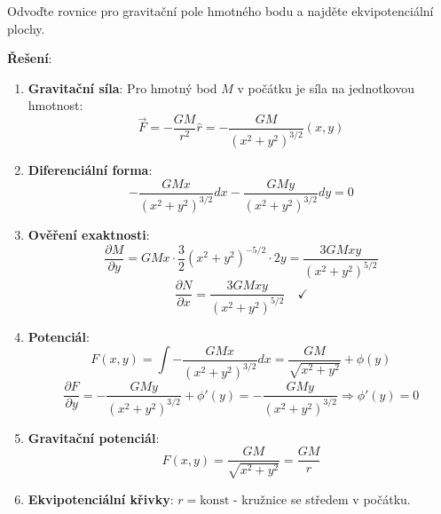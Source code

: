 \begin{example}
Odvoďte rovnice pro gravitační pole hmotného bodu a najděte ekvipotenciální plochy.
\vspace{0.3\baselineskip}

\textbf{Řešení}:
\begin{enumerate}
\item \textbf{Gravitační síla}: Pro hmotný bod $M$ v počátku je síla na jednotkovou hmotnost:
\[
\vec{F} = -\frac{GM}{r^2} \hat{r} = -\frac{GM}{(x^2 + y^2)^{3/2}}(x, y)
\]

\item \textbf{Diferenciální forma}:
\[
-\frac{GMx}{(x^2 + y^2)^{3/2}}dx - \frac{GMy}{(x^2 + y^2)^{3/2}}dy = 0
\]

\item \textbf{Ověření exaktnosti}:
\[
\frac{\partial M}{\partial y} = GMx \cdot \frac{3}{2}(x^2 + y^2)^{-5/2} \cdot 2y = \frac{3GMxy}{(x^2 + y^2)^{5/2}}
\]
\[
\frac{\partial N}{\partial x} = \frac{3GMxy}{(x^2 + y^2)^{5/2}} \quad \checkmark
\]

\item \textbf{Potenciál}:
\[
F(x, y) = \int -\frac{GMx}{(x^2 + y^2)^{3/2}}dx = \frac{GM}{\sqrt{x^2 + y^2}} + \phi(y)
\]
\[
\frac{\partial F}{\partial y} = -\frac{GMy}{(x^2 + y^2)^{3/2}} + \phi'(y) = -\frac{GMy}{(x^2 + y^2)^{3/2}} \Rightarrow \phi'(y) = 0
\]

\item \textbf{Gravitační potenciál}:
\[
F(x, y) = \frac{GM}{\sqrt{x^2 + y^2}} = \frac{GM}{r}
\]

\item \textbf{Ekvipotenciální křivky}: $r = \text{konst}$ - kružnice se středem v počátku.
\end{enumerate}
\end{example}

\vspace{0.6\baselineskip}

